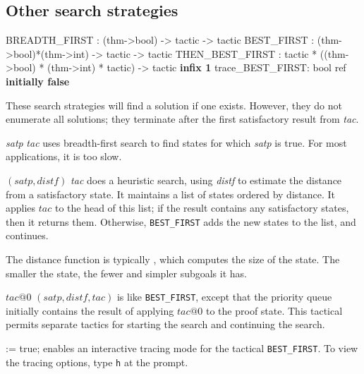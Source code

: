 \subsection{Other search strategies}
\begin{ttbox} 
BREADTH_FIRST   :            (thm->bool) -> tactic -> tactic
BEST_FIRST      : (thm->bool)*(thm->int) -> tactic -> tactic
THEN_BEST_FIRST : tactic * ((thm->bool) * (thm->int) * tactic)
                  -> tactic                    \hfill{\bf infix 1}
trace_BEST_FIRST: bool ref \hfill{\bf initially false}
\end{ttbox}
These search strategies will find a solution if one exists.  However, they
do not enumerate all solutions; they terminate after the first satisfactory
result from {\it tac}.
\begin{ttdescription}
\item[\ttindexbold{BREADTH_FIRST} {\it satp} {\it tac}] 
uses breadth-first search to find states for which {\it satp\/} is true.
For most applications, it is too slow.

\item[\ttindexbold{BEST_FIRST} $(satp,distf)$ {\it tac}] 
does a heuristic search, using {\it distf\/} to estimate the distance from
a satisfactory state.  It maintains a list of states ordered by distance.
It applies $tac$ to the head of this list; if the result contains any
satisfactory states, then it returns them.  Otherwise, {\tt BEST_FIRST}
adds the new states to the list, and continues.  

The distance function is typically , which computes
the size of the state.  The smaller the state, the fewer and simpler
subgoals it has.

\item[$tac@0$ \ttindexbold{THEN_BEST_FIRST} $(satp,distf,tac)$] 
is like {\tt BEST_FIRST}, except that the priority queue initially
contains the result of applying $tac@0$ to the proof state.  This tactical
permits separate tactics for starting the search and continuing the search.

\item[\ttindexbold{trace_BEST_FIRST} := true;] 
enables an interactive tracing mode for the tactical {\tt BEST_FIRST}.  To
view the tracing options, type {\tt h} at the prompt.
\end{ttdescription}


